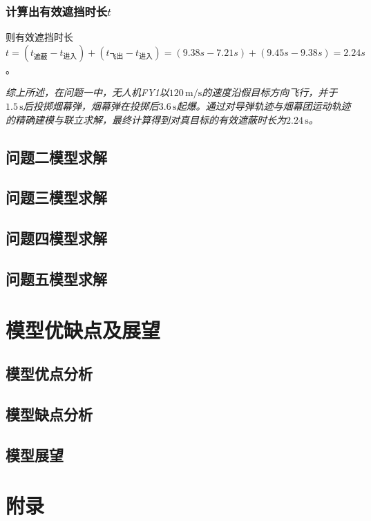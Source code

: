 \documentclass{article}
\begin{document}
\subsubsection{计算出有效遮挡时长$t$}
则有效遮挡时长$t =(t_\text{遮蔽}- t_\text{进入}) + (t_{\text{飞出}} - t_{\text{进入}}) = (9.38s - 7.21s) + (9.45s - 9.38s) = 2.24s$。

\textit{综上所述，在问题一中，无人机FY1以$120\,\mathrm{m/s}$的速度沿假目标方向飞行，并于$1.5\,\mathrm{s}$后投掷烟幕弹，烟幕弹在投掷后$3.6\,\mathrm{s}$起爆。通过对导弹轨迹与烟幕团运动轨迹的精确建模与联立求解，最终计算得到对真目标的有效遮蔽时长为$2.24\,\mathrm{s}$。}

\subsection{问题二模型求解}

\subsection{问题三模型求解}

\subsection{问题四模型求解}

\subsection{问题五模型求解}

\section{模型优缺点及展望}

\subsection{模型优点分析}

\subsection{模型缺点分析}

\subsection{模型展望}




\section*{附录}
\vspace{-1em}


\noindent
\end{document}
